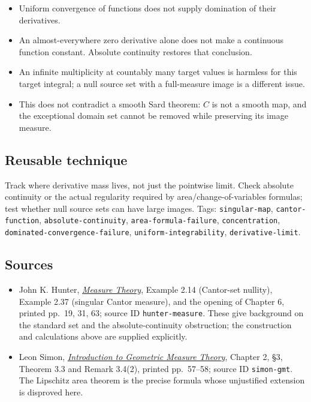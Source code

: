 \documentclass[
  11pt,
]{article}
\providecommand{\tightlist}{%
  \setlength{\itemsep}{0pt}\setlength{\parskip}{0pt}}
\begin{document}
\begin{itemize}
\tightlist
\item
  Uniform convergence of functions does not supply domination of their
  derivatives.
\item
  An almost-everywhere zero derivative alone does not make a continuous
  function constant. Absolute continuity restores that conclusion.
\item
  An infinite multiplicity at countably many target values is harmless
  for this target integral; a null source set with a full-measure image
  is a different issue.
\item
  This does not contradict a smooth Sard theorem: \(C\) is not a smooth
  map, and the exceptional domain set cannot be removed while preserving
  its image measure.
\end{itemize}

\subsection{Reusable technique}\label{reusable-technique-12}

Track where derivative mass lives, not just the pointwise limit. Check
absolute continuity or the actual regularity required by
area/change-of-variables formulas; test whether null source sets can
have large images. Tags: \texttt{singular-\allowbreak{}map},
\texttt{cantor-\allowbreak{}function}, \texttt{absolute-\allowbreak{}continuity},
\texttt{area-\allowbreak{}formula-\allowbreak{}failure}, \texttt{concentration},
\texttt{dominated-\allowbreak{}convergence-\allowbreak{}failure}, \texttt{uniform-\allowbreak{}integrability},
\texttt{derivative-\allowbreak{}limit}.

\subsection{Sources}\label{sources-12}

\begin{itemize}
\tightlist
\item
  John K. Hunter,
  \href{https://www.math.ucdavis.edu/~hunter/measure_theory/measure_notes.pdf}{\emph{Measure
  Theory}}, Example 2.14 (Cantor-set nullity), Example 2.37 (singular
  Cantor measure), and the opening of Chapter 6, printed pp.~19, 31, 63;
  source ID \texttt{hunter-\allowbreak{}measure}. These give background on the
  standard set and the absolute-continuity obstruction; the construction
  and calculations above are supplied explicitly.
\item
  Leon Simon,
  \href{https://math.stanford.edu/~lms/ntu-gmt-text.pdf}{\emph{Introduction
  to Geometric Measure Theory}}, Chapter 2, §3, Theorem 3.3 and Remark
  3.4(2), printed pp.~57--58; source ID \texttt{simon-\allowbreak{}gmt}. The
  Lipschitz area theorem is the precise formula whose unjustified
  extension is disproved here.
\end{itemize}
\end{document}
